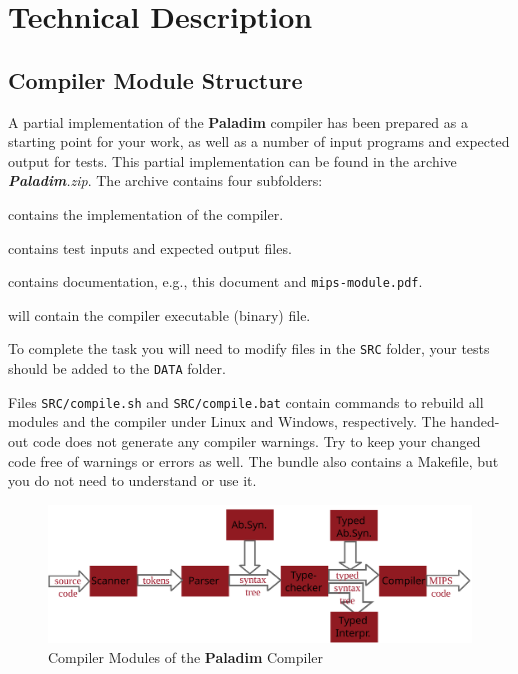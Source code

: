 \documentclass[12pt,a4paper]{article}
\newcommand{\paladim}{\textbf{Paladim}\xspace}
\begin{document}
\section{Technical Description}


\subsection{Compiler Module Structure}

A partial implementation of the \paladim compiler has been prepared
as a starting point for your work, as well as a number of
input programs and expected output for tests.
%
This partial implementation can be found in the archive
{\it \paladim.zip}. The archive contains four subfolders:
\begin{description}
\setlength{\itemsep}{0.1ex}

\item[{\tt SRC/}:] contains the implementation of the compiler.

\item[{\tt DATA/}:] contains test inputs and expected output files.

\item[{\tt DOC/}:] contains documentation, e.g., this document and {\tt mips-module.pdf}.

\item[{\tt BIN/}:] will contain the compiler executable (binary) file.

\end{description}

To complete the task you will need to modify files in the {\tt SRC} folder,
your tests should be added to the \texttt{DATA} folder.

Files {\tt SRC/compile.sh} and {\tt SRC/compile.bat} contain commands
to rebuild all modules and the compiler under Linux and Windows, respectively.
%
The handed-out code does not generate any compiler warnings. Try to keep your
changed code free of warnings or errors as well.
%
The bundle also contains a Makefile, but you do not need to understand or
use it.


\begin{figure}[t]
\includegraphics[width=\textwidth]{compilation}
\caption{Compiler Modules of the \paladim Compiler}
\label{fig:chain}
\end{figure}
\end{document}
